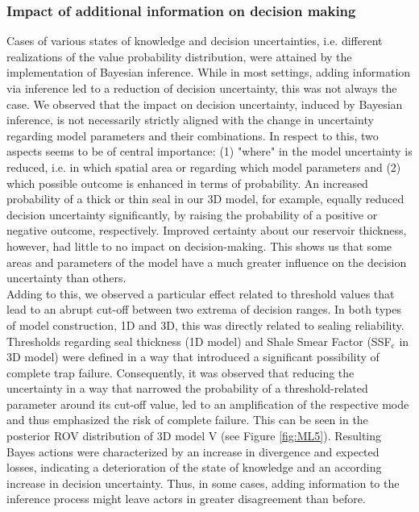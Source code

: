 	\subsubsection{Impact of additional information on decision making}
	Cases of various states of knowledge and decision uncertainties, i.e. different realizations of the value probability distribution, were attained by the implementation of Bayesian inference. While in most settings, adding information via inference led to a reduction of decision uncertainty, this was not always the case. We observed that the impact on decision uncertainty, induced by Bayesian inference, is not necessarily strictly aligned with the change in uncertainty regarding model parameters and their combinations. In respect to this, two aspects seems to be of central importance: (1) "where" in the model uncertainty is reduced, i.e. in which spatial area or regarding which model parameters and (2) which possible outcome is enhanced in terms of probability. An increased probability of a thick or thin seal in our 3D model, for example, equally reduced decision uncertainty significantly, by raising the probability of a positive or negative outcome, respectively. Improved certainty about our reservoir thickness, however, had little to no impact on decision-making. This shows us that some areas and parameters of the model have a much greater influence on the decision uncertainty than others.\\
	Adding to this, we observed a particular effect related to threshold values that lead to an abrupt cut-off between two extrema of decision ranges. In both types of model construction, 1D and 3D, this was directly related to sealing reliability. Thresholds regarding seal thickness (1D model) and Shale Smear Factor (SSF$_\text{c}$ in 3D model) were defined in a way that introduced a significant possibility of complete trap failure. Consequently, it was observed that reducing the uncertainty in a way that narrowed the probability of a threshold-related parameter around its cut-off value, led to an amplification of the respective mode and thus emphasized the risk of complete failure. This can be seen in the posterior ROV distribution of 3D model V (see Figure \ref{fig:ML5}). Resulting Bayes actions were characterized by an increase in divergence and expected losses, indicating a deterioration of the state of knowledge and an according increase in decision uncertainty. Thus, in some cases, adding information to the inference process might leave actors in greater disagreement than before.
